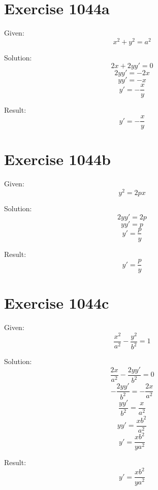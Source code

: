 \documentclass[a4paper, 10pt]{scrartcl}
\begin{document}
\section{Exercise 1044a}

Given:
\[
x^{2} + y^{2} = a^{2}
\]

Solution:
\[
2x + 2yy' = 0
\]
\[
2yy' = -2x
\]
\[
yy' = -x
\]
\[
y' = -\frac{x}{y}
\]

Result:
\[
y' = -\frac{x}{y}
\]

\section{Exercise 1044b}

Given:
\[
y^{2} = 2px
\]

Solution:
\[
2yy' = 2p
\]
\[
yy' = p
\]
\[
y' = \frac{p}{y}
\]

Result:
\[
y' = \frac{p}{y}
\]

\section{Exercise 1044c}

Given:
\[
\frac{x^{2}}{a^{2}} - \frac{y^{2}}{b^{2}} = 1
\]

Solution:
\[
\frac{2x}{a^{2}} - \frac{2yy'}{b^{2}} = 0
\]
\[
-\frac{2yy'}{b^{2}} = -\frac{2x}{a^{2}}
\]
\[
\frac{yy'}{b^{2}} = \frac{x}{a^{2}}
\]
\[
yy' = \frac{xb^{2}}{a^{2}}
\]
\[
y' = \frac{xb^{2}}{ya^{2}}
\]

Result:
\[
y' = \frac{xb^{2}}{ya^{2}}
\]
\end{document}
